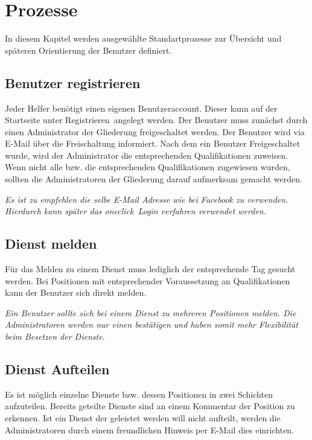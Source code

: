 \chapter{Prozesse}
\label{cha:prozesse}
In diesem Kapitel werden ausgewählte Standartprozesse zur Übersicht und späteren Orientierung der Benutzer definiert.

\section{Benutzer registrieren}
\label{sec:process_register}
Jeder Helfer benötigt einen eigenen Benutzeraccount. Dieser kann auf der Startseite unter \glqq Registrieren\grqq ~angelegt werden. Der Benutzer muss zunächst durch einen Administrator der Gliederung freigeschaltet werden. Der Benutzer wird via E-Mail über die Freischaltung informiert. Nach dem ein Benutzer Freigeschaltet wurde, wird der Administrator die entsprechenden Qualifikationen zuweisen. Wenn nicht alle bzw. die entsprechenden Qualifikationen zugewiesen wurden, sollten die Administratoren der Gliederung darauf aufmerksam gemacht werden.

\noindent \textit{Es ist zu empfehlen die selbe E-Mail Adresse wie bei Facebook zu verwenden. Hierdurch kann später das \glqq oneclick\grqq ~Login verfahren verwendet werden.}

\section{Dienst melden}
\label{sec:process_position_apply}
Für das Melden zu einem Dienst muss lediglich der entsprechende Tag gesucht werden. Bei Positionen mit entsprechender Voraussetzung an Qualifikationen kann der Benutzer sich direkt melden.

\noindent \textit{Ein Benutzer sollte sich bei einem Dienst zu mehreren Positionen melden. Die Administratoren werden nur einen bestätigen und haben somit mehr Flexibilität beim Besetzen der Dienste.}

\section{Dienst Aufteilen}
\label{sec:process_service_split}
Es ist möglich einzelne Dienste bzw. dessen Positionen in zwei Schichten aufzuteilen. Bereits geteilte Dienste sind an einem Kommentar der Position zu erkennen. Ist ein Dienst der geleistet werden will nicht aufteilt, werden die Administratoren durch einem freundlichen Hinweis per E-Mail dies einrichten.

